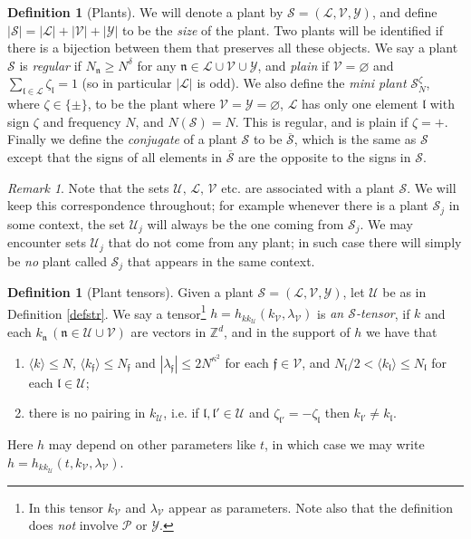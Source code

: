 \documentclass[11 pt,reqno]{amsart}
\theoremstyle{definition}
\newtheorem{df}[thm]{Definition}
\theoremstyle{remark}
\newtheorem{rem}[thm]{Remark}
\numberwithin{equation}{section}
\newcommand{\Sc}{\mathcal{S}}
\newcommand{\Lc}{\mathcal{L}}
\newcommand{\Pc}{\mathcal{P}}
\newcommand{\Uc}{\mathcal{U}}
\newcommand{\Vc}{\mathcal{V}}
\newcommand{\Yc}{\mathcal{Y}}
\newcommand{\Zb}{\mathbb{Z}}
\newcommand{\ff}{\mathfrak{f}}
\newcommand{\nf}{\mathfrak{n}}
\newcommand{\lf}{\mathfrak{l}}
\begin{document}
{\begin{df}[Plants]
We will denote a plant by $\Sc=(\Lc,\Vc,\Yc)$, and define $|\Sc|=|\Lc|+|\Vc|+|\Yc|$ to be the \emph{size} of the plant. Two plants will be identified if there is a bijection between them that preserves all these objects. We say a plant $\Sc$ is \emph{regular} if $N_\nf\geq N^\delta$ for any $\nf\in\Lc\cup\Vc\cup\Yc$, and \emph{plain} if $\Vc=\varnothing$ and $\sum_{\lf\in\Lc}\zeta_\lf=1$ (so in particular $|\Lc|$ is odd). We also define the \emph{mini plant} $\Sc_N^\zeta$, where $\zeta\in\{\pm\}$, to be the plant where $\Vc=\Yc=\varnothing$, $\Lc$ has only one element $\lf$ with sign $\zeta $ and frequency $N$, and $N(\Sc)=N$. This is regular, and is plain if $\zeta=+$. Finally we define the \emph{conjugate} of a plant $\Sc$ to be $\overline{\Sc}$, which is the same as $\Sc$ except that the signs of all elements in $\overline{\Sc}$ are the opposite to the signs in $\Sc$.
 \end{df} 
 \begin{rem}\label{notationrem} Note that the sets $\Uc,\,\Lc,\,\Vc$ etc. are associated with a plant $\Sc$. We will keep this correspondence throughout; for example whenever there is a plant $\Sc_j$ in some context, the set $\Uc_j$ will always be the one coming from $\Sc_j$. We may encounter sets $\Uc_j$ that do not come from any plant; in such case there will simply be \emph{no} plant called $\Sc_j$ that appears in the same context.
 \end{rem}
 \begin{df}[Plant tensors]\label{deftensor} Given a plant $\Sc=(\Lc,\Vc,\Yc)$, let $\Uc$ be as in Definition \ref{defstr}. We say a tensor\footnote{In this tensor $k_\Vc$ and $\lambda_\Vc$ appear as parameters. Note also that the definition does \emph{not} involve $\Pc$ or $\Yc$.} $h=h_{kk_\Uc}(k_\Vc,\lambda_\Vc)$ is \emph{an $\Sc$-tensor}, if $k$ and each $k_\nf\,(\nf\in\Uc\cup\Vc)$ are vectors in $\Zb^d$, and in the support of $h$ we have that 
 \begin{enumerate}
 \item $\langle k\rangle\leq N$, $\langle k_\ff\rangle\leq N_\ff$ and $|\lambda_\ff|\leq 2N^{\kappa^2}$ for each $\ff\in\Vc$, and $N_\lf/2<\langle k_\lf\rangle\leq N_\lf$ for each $\lf\in\Uc$;
 \item there is no pairing in $k_\Uc$, i.e. if $\lf,\lf'\in\Uc$ and $\zeta_{\lf'}=-\zeta_\lf$ then $k_{\lf'}\neq k_\lf$.
 \end{enumerate} Here $h$ may depend on other parameters like $t$, in which case we may write $h=h_{kk_\Uc}(t,k_\Vc,\lambda_\Vc)$.
  

\end{df}}
\end{document}
